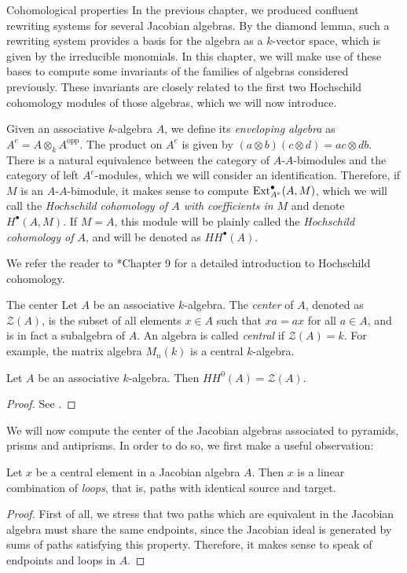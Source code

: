 \begin{chapter}{Cohomological properties}
In the previous chapter, we produced confluent rewriting systems for several Jacobian algebras. By the diamond lemma, such a rewriting system provides a basis for the algebra as a $k$-vector space, which is given by the irreducible monomials. In this chapter, we will make use of these bases to compute some invariants of the families of algebras considered previously. These invariants are closely related to the first two Hochschild cohomology modules of those algebras, which we will now introduce.

Given an associative $k$-algebra $A$, we define its \emph{enveloping algebra} as $A^e=A\otimes_k A^{\mathrm{opp}}$. The product on $A^e$ is given by $(a\otimes b)(c\otimes d)=ac\otimes db$.
There is a natural equivalence between the category of $A$-$A$-bimodules and the category of left $A^e$-modules, which we will consider an identification. Therefore, if $M$ is an $A$-$A$-bimodule, it makes sense to compute $\operatorname{Ext}^\bullet_{A^e}(A,M)$, which we will call the \emph{Hochschild cohomology of $A$ with coefficients in $M$} and denote $H^\bullet(A,M)$.
If $M=A$, this module will be plainly called the \emph{Hochschild cohomology of $A$}, and will be denoted as $HH^\bullet(A)$.

We refer the reader to \cite{Wei94}*{Chapter 9} for a detailed introduction to Hochschild cohomology.

\begin{section}{The center}
Let $A$ be an associative $k$-algebra. The \emph{center} of $A$, denoted as $\mathcal{Z}(A)$, is the subset of all elements $x\in A$ such that $xa=ax$ for all $a\in A$, and is in fact a subalgebra of $A$. An algebra is called \emph{central} if $\mathcal{Z}(A)=k$. For example, the matrix algebra $M_n(k)$ is a central $k$-algebra.

\begin{lemma} Let $A$ be an associative $k$-algebra. Then $HH^0(A) = \mathcal{Z}(A)$.
\end{lemma}
\begin{proof} See \cite{Red01}.
\end{proof}

We will now compute the center of the Jacobian algebras associated to pyramids, prisms and antiprisms. In order to do so, we first make a useful observation:

\begin{obs}\label{central-endpoints} Let $x$ be a central element in a Jacobian algebra $A$. Then $x$ is a linear combination of \emph{loops}, that is, paths with identical source and target.
\end{obs}
\begin{proof} First of all, we stress that two paths which are equivalent in the Jacobian algebra must share the same endpoints, since the Jacobian ideal is generated by sums of paths satisfying this property. Therefore, it makes sense to speak of endpoints and loops in $A$.


\end{proof}
\end{section}
\end{chapter}
